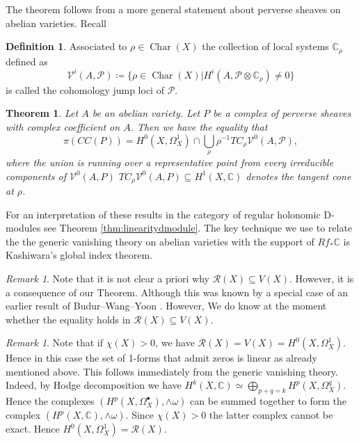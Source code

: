 \documentclass[12pt,reqno]{amsart}
\newtheorem{alphtheorem}{Theorem}
\theoremstyle{question}
\theoremstyle{definition}
\newtheorem{definition}[theorem]{Definition}
\theoremstyle{remark}
\newtheorem{remark}[theorem]{Remark}
\theoremstyle{cited}
\theoremstyle{citeddef}
\DeclareMathOperator{\Char}{Char}
\newcommand{\sP}{\mathcal{P}}
\newcommand{\sR}{\mathcal{R}}
\newcommand\sV{{\mathcal V}}
\newcommand{\bbC}{\mathbb{C}}
\begin{document}
The theorem follows from a more general statement
about perverse sheaves on abelian varieties. Recall
\begin{definition}
Associated to $\rho\in \Char(X)$ the collection of local systems $\bbC_{\rho}$ defined as
\[\sV^i(A, \sP) \coloneqq \{\rho\in\Char(X)| H^i(A, \sP\otimes \bbC_{\rho}) \neq 0\}\]
is called the cohomology jump loci of $\sP$.
\label{def:cjl}
\end{definition}
\begin{alphtheorem}
Let $A$ be an abelian variety. Let $P$ be a complex of perverse sheaves with complex coefficient on $A$. 
Then we have the equality that
$$\pi(CC(P)) = H^0(X, \Omega_X^1)\cap \bigcup_{\rho} \rho^{-1} TC_{\rho} \sV^0(A,\sP), $$
where the union is running over a representative point from every irreducible components of $\sV^0(A,P)$
$TC_{\rho} \sV^0(A,P) \subseteq H^1(X, \bbC)$ denotes the tangent cone at $\rho$. 
\label{thm:perverse}
\end{alphtheorem}

For an
interpretation of these results in the category of regular holonomic D-modules
see Theorem \ref{thm:linearitydmodule}. The key technique we
use to relate the the generic vanishing theory on abelian varieties with the support of $Rf_*\bbC$ is Kashiwara's
global index theorem. 


\begin{remark}
Note that it is not clear a priori why $\sR(X)\subseteq V(X)$. However, it is a consequence of our Theorem. Although this was known by a special case of an earlier result of Budur--Wang--Yoon
\cite{BWY}. However,
We do know at the moment whether the equality holds in $\sR(X) \subseteq V(X)$. 
\end{remark}

\begin{remark}
Note that if $\chi(X)>0$, we have $\sR(X) = V(X) = H^0(X, \Omega_X^1)$. Hence in this case the set of 1-forms that admit zeros is linear as already mentioned above. 
This follows immediately from the generic vanishing theory. Indeed, by Hodge decomposition
we have
$H^k(X,\bbC) \simeq \bigoplus_{p+q = k} H^p(X,\Omega_X^q)$. Hence the complexes $(H^p(X, \Omega_X^{\bullet}), \wedge\omega)$ can be summed together to form the complex $(H^p(X, \bbC), \wedge\omega)$. Since $\chi(X)>0$ the latter complex cannot be exact. Hence $H^0(X,\Omega_X^1)
= \sR(X)$.
\end{remark}
\end{document}
